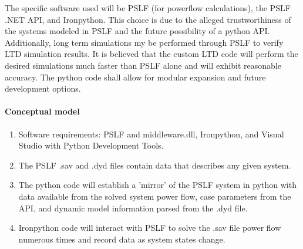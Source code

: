 \documentclass[12pt]{article}
\begin{document}
The specific software used will be PSLF (for powerflow calculations), the PSLF .NET API, and Ironpython. This choice is due to the alleged trustworthiness of the systems modeled in PSLF and the future possibility of a python API. Additionally, long term simulations my be performed through PSLF to verify LTD simulation results. It is believed that the custom LTD code will perform the desired simulations much faster than PSLF alone and will exhibit reasonable accuracy. The python code shall allow for modular expansion and future development options.

\pagebreak
\paragraph{Conceptual model}
\begin{enumerate}
\item Software requirements: PSLF and middleware.dll, Ironpython, and Visual Studio with Python Development Tools.
\item The PSLF .sav and .dyd files contain data that describes any given system.
\item The python code will establish a 'mirror' of the PSLF system in python with data available from the solved system power flow, case parameters from the API, and dynamic model information parsed from the .dyd file.
\item Ironpython code will interact with PSLF to solve the .sav file power flow numerous times and record data as system states change.


\end{enumerate}
\end{document}

